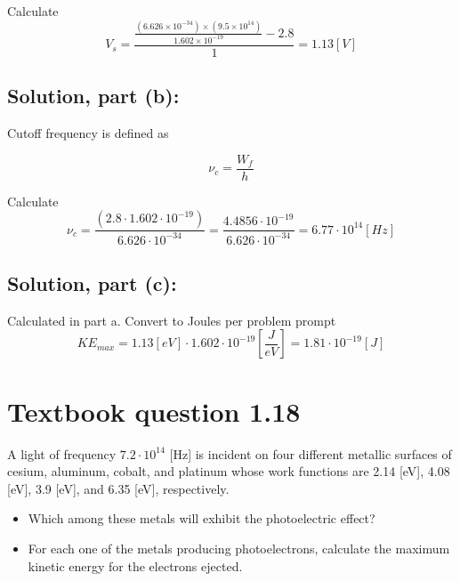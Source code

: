 \documentclass[12pt]{article}
\begin{document}
        Calculate
        \begin{equation}
            V_s = \frac{\frac{(6.626 \times 10^{-34}) \times (9.5 \times 10^{14})}{1.602 \times 10^{-19}} - 2.8}{1} = 1.13 [V]
        \end{equation}

    \subsection{Solution, part (b):}
        Cutoff frequency is defined as    
        
        \begin{equation}
            \nu_c = \frac{W_f}{h}
        \end{equation}

        Calculate
        \begin{equation}
            \nu_c = \frac{(2.8 \cdot 1.602 \cdot 10^{-19})}{6.626 \cdot 10^{-34}} = \frac{4.4856 \cdot 10^{-19}}{6.626 \cdot 10^{-34}} = 6.77 \cdot 10^{14} [Hz]
        \end{equation}
    
    \subsection{Solution, part (c):}
        Calculated in part a. Convert to Joules per problem prompt
        \begin{equation}
            KE_{max} = 1.13 [eV] \cdot 1.602 \cdot 10^{-19} [\frac{J}{eV}] = 1.81 \cdot 10^{-19} [J]
        \end{equation}
          
\section*{Textbook question 1.18}
    A light of frequency $7.2 \cdot 10^{14}$ [Hz] is incident on four different metallic surfaces of cesium, aluminum, cobalt, and platinum whose work functions are 2.14 [eV], 4.08 [eV], 3.9 [eV], and 6.35 [eV], respectively.
    \begin{itemize}
        \item [(a)] Which among these metals will exhibit the photoelectric effect?
        \item [(b)] For each one of the metals producing photoelectrons, calculate the maximum kinetic energy for the electrons ejected.
    \end{itemize}
\end{document}

